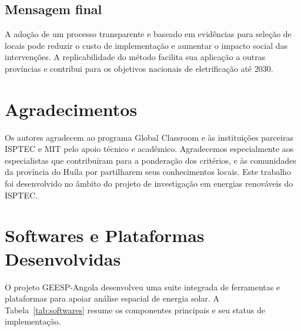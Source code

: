 \documentclass[12pt, a4paper]{article}
\begin{document}
\subsection{Mensagem final}

A adoção de um processo transparente e baseado em evidências para seleção de locais pode reduzir o custo de implementação e aumentar o impacto social das intervenções. A replicabilidade do método facilita sua aplicação a outras províncias e contribui para os objetivos nacionais de eletrificação até 2030.

\section*{Agradecimentos}

Os autores agradecem ao programa Global Classroom e às instituições parceiras ISPTEC e MIT pelo apoio técnico e acadêmico. Agradecemos especialmente aos especialistas que contribuíram para a ponderação dos critérios, e às comunidades da província do Huíla por partilharem seus conhecimentos locais. Este trabalho foi desenvolvido no âmbito do projeto de investigação em energias renováveis do ISPTEC.




\section{Softwares e Plataformas Desenvolvidas}

O projeto GEESP-Angola desenvolveu uma suite integrada de ferramentas e plataformas para apoiar análise espacial de energia solar. A Tabela~\ref{tab:softwares} resume os componentes principais e seu status de implementação.
\end{document}
